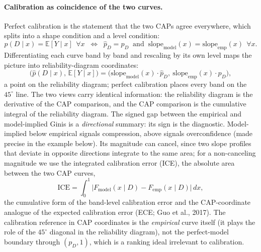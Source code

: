 \documentclass[12pt]{article}
\newcommand{\pD}{p_D}
\newcommand{\slope}{\mathrm{slope}}
\newcommand{\E}{\mathbb{E}}
\begin{document}
\paragraph{Calibration as coincidence of the two curves.} Perfect calibration is the statement
that the two CAPs agree everywhere, which splits into a shape condition and a level condition:
\begin{equation}\label{eq:calib-cond}
\hat p(D\mid x)=\E[Y\mid x]\ \ \forall x
\;\;\Longleftrightarrow\;\;
\hat p_D=\pD
\ \text{ and }\
\slope_{\text{model}}(x)=\slope_{\text{emp}}(x)\ \ \forall x .
\end{equation}
Differentiating each curve band by band and rescaling by its own level maps the picture into
reliability-diagram coordinates:
\begin{equation}\label{eq:reliability}
\bigl(\hat p(D\mid x),\,\E[Y\mid x]\bigr)
=\bigl(\slope_{\text{model}}(x)\cdot\hat p_D,\ \slope_{\text{emp}}(x)\cdot\pD\bigr),
\end{equation}
a point on the reliability diagram; perfect calibration places every band on the $45^\circ$
line. The two views carry identical information: the reliability diagram is the derivative of
the CAP comparison, and the CAP comparison is the cumulative integral of the reliability
diagram. The signed gap between the empirical and model-implied Ginis is a \emph{directional}
summary: its sign is the diagnostic. Model-implied below empirical signals compression, above
signals overconfidence (made precise in the example below). Its magnitude can cancel, since two
slope profiles that deviate in opposite directions integrate to the same area; for a
non-canceling magnitude we use the integrated calibration error (ICE), the absolute area
between the two CAP curves,
\begin{equation}\label{eq:ice}
\mathrm{ICE}=\int_0^1 \bigl|F_{\text{model}}(x\mid D)-F_{\text{emp}}(x\mid D)\bigr|\,dx,
\end{equation}
the cumulative form of the band-level calibration error and the CAP-coordinate analogue of the
expected calibration error (ECE; Guo et al., 2017). The calibration reference in CAP
coordinates is the \emph{empirical} curve itself (it plays the role of the $45^\circ$
diagonal in the reliability diagram), not the perfect-model boundary through $(\pD,1)$,
which is a ranking ideal irrelevant to calibration.
\end{document}
